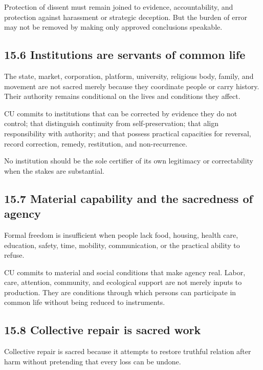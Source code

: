 \documentclass[
  11pt,
]{article}
\begin{document}
Protection of dissent must remain joined to evidence, accountability,
and protection against harassment or strategic deception. But the burden
of error may not be removed by making only approved conclusions
speakable.

\subsection{15.6 Institutions are servants of common
life}\label{institutions-are-servants-of-common-life}

The state, market, corporation, platform, university, religious body,
family, and movement are not sacred merely because they coordinate
people or carry history. Their authority remains conditional on the
lives and conditions they affect.

CU commits to institutions that can be corrected by evidence they do not
control; that distinguish continuity from self-preservation; that align
responsibility with authority; and that possess practical capacities for
reversal, record correction, remedy, restitution, and non-recurrence.

No institution should be the sole certifier of its own legitimacy or
correctability when the stakes are substantial.

\subsection{15.7 Material capability and the sacredness of
agency}\label{material-capability-and-the-sacredness-of-agency}

Formal freedom is insufficient when people lack food, housing, health
care, education, safety, time, mobility, communication, or the practical
ability to refuse.

CU commits to material and social conditions that make agency real.
Labor, care, attention, community, and ecological support are not merely
inputs to production. They are conditions through which persons can
participate in common life without being reduced to instruments.

\subsection{15.8 Collective repair is sacred
work}\label{collective-repair-is-sacred-work}

Collective repair is sacred because it attempts to restore truthful
relation after harm without pretending that every loss can be undone.
\end{document}

